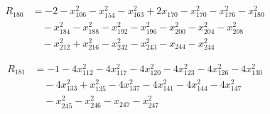 \begin{align*}
R_{180} &= -2 -x_{106}^{2} -x_{154}^{2} -x_{163}^{2} +2 x_{170} -x_{170}^{2} -x_{176}^{2} -x_{180}^{2} \\
&\quad -x_{184}^{2} -x_{188}^{2} -x_{192}^{2} -x_{196}^{2} -x_{200}^{2} -x_{204}^{2} -x_{208}^{2} \\
&\quad -x_{212}^{2} +x_{216}^{2} -x_{242}^{2} -x_{243}^{2} -x_{244} -x_{244}^{2}
\end{align*}

\begin{align*}
R_{181} &= -1 -4 x_{112}^{2} -4 x_{117}^{2} -4 x_{120}^{2} -4 x_{123}^{2} -4 x_{126}^{2} -4 x_{130}^{2} \\
&\quad -4 x_{133}^{2} +x_{135}^{2} -4 x_{137}^{2} -4 x_{141}^{2} -4 x_{144}^{2} -4 x_{147}^{2} \\
&\quad -x_{245}^{2} -x_{246}^{2} -x_{247} -x_{247}^{2}
\end{align*}
